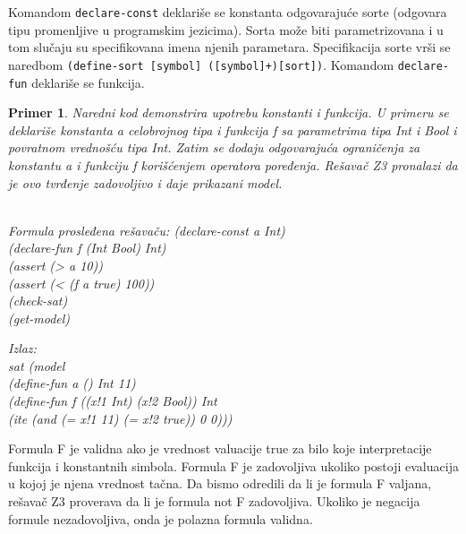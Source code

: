 \documentclass[12pt,oneside]{memoir}
\newtheorem{primer}{Primer}
\begin{document}
Komandom \texttt{declare-const} deklariše se konstanta odgovarajuće sorte (odgovara tipu promenljive u programskim jezicima). Sorta može biti parametrizovana i u tom slučaju su specifikovana imena njenih parametara. Specifikacija sorte vrši se naredbom \texttt{(define-sort [symbol] ([symbol]+)[sort])}.
Komandom \texttt{declare-fun} deklariše se funkcija. 


\begin{primer} Naredni kod demonstrira upotrebu konstanti i funkcija. U primeru se deklariše konstanta a celobrojnog tipa i funkcija f sa parametrima tipa Int i Bool i povratnom vrednošću tipa Int. Zatim se dodaju odgovarajuća ograničenja za konstantu a i funkciju f korišćenjem operatora poređenja. Rešavač Z3 pronalazi da je ovo tvrđenje zadovoljivo i daje prikazani model. 
\\ \\

\hspace{-0.7cm}
\begin{minipage}[b]{0.4\textwidth}
Formula prosleđena rešavaču:
(declare-const a Int)\\
(declare-fun f (Int Bool) Int)\\
(assert (> a 10))\\
(assert (< (f a true) 100))\\
(check-sat)\\
(get-model) \\
\end{minipage}
\hspace{2.4cm}
\begin{minipage}[t]{0.4\textwidth}
\vspace{-4.75cm}
Izlaz:
\\sat (model 
\\(define-fun a () Int 11) 
\\(define-fun f ((x!1 Int) (x!2 Bool)) Int 
\\(ite (and (= x!1 11) (= x!2 true)) 0 0)))
\end{minipage}
\end{primer}


Formula F je validna ako je vrednost valuacije true za bilo koje interpretacije funkcija i konstantnih simbola. Formula F je zadovoljiva ukoliko postoji evaluacija u kojoj je njena vrednost tačna. Da bismo odredili da li je formula F valjana, rešavač Z3 proverava da li je formula not F zadovoljiva. Ukoliko je negacija formule nezadovoljiva, onda je polazna formula validna. 
\end{document}
